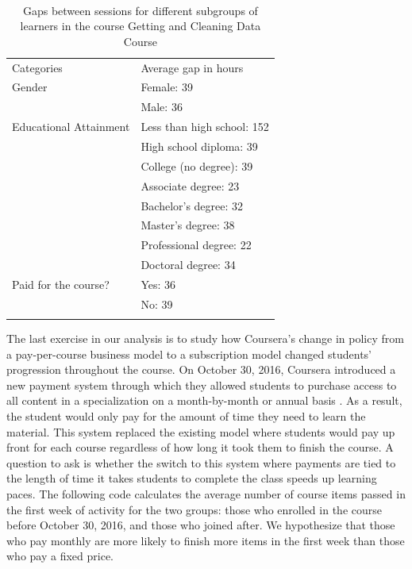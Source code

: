 \begin{table}
\footnotesize
\caption{Gaps between sessions for different subgroups of learners in the course Getting and Cleaning Data Course}\
\centering
\label{tab:timecats}
\begin{tabular}{p{3cm}|p{4cm}}
Categories & Average gap in hours \\
\addlinespace
\toprule
Gender & Female: 39\\
       & Male: 36\\
\midrule
Educational Attainment & Less than high school: 152\\
           & High school diploma: 39\\
           & College (no degree): 39\\
           & Associate degree: 23\\
           & Bachelor's degree: 32\\
           & Master's degree: 38\\
           & Professional degree: 22\\
           & Doctoral degree: 34\\
\midrule
Paid for the course? & Yes: 36\\
           & No: 39\\
\addlinespace
\bottomrule
\end{tabular}
\end{table}

The last exercise in our analysis is to study how Coursera's change in
policy from a pay-per-course business model to a subscription model
changed students' progression throughout the course. On October 30,
2016, Coursera introduced a new payment system through which they
allowed students to purchase access to all content in a specialization
on a month-by-month or annual basis \citep{coursera2016}. As a result,
the student would only pay for the amount of time they need to learn the
material. This system replaced the existing model where students would
pay up front for each course regardless of how long it took them to
finish the course. A question to ask is whether the switch to this
system where payments are tied to the length of time it takes students
to complete the class speeds up learning paces. The following code
calculates the average number of course items passed in the first week
of activity for the two groups: those who enrolled in the course before
October 30, 2016, and those who joined after. We hypothesize that those
who pay monthly are more likely to finish more items in the first week
than those who pay a fixed price.

